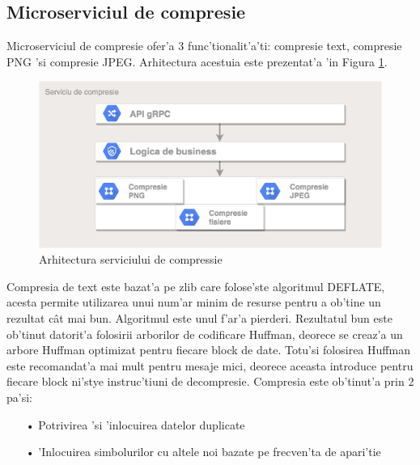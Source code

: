 \documentclass[12pt,a4paper,twoside]{report}
\begin{document}
\subsection{Microserviciul de compresie} \label{s_compession}
Microserviciul de compresie ofer'a 3 func'tionalit'a'ti: compresie text, compresie PNG 'si compresie JPEG. Arhitectura acestuia este prezentat'a 'in Figura \ref{compress_arch}.
\begin{figure}[H]
\begin{center}
\advance\leftskip-3cm
\advance\rightskip-3cm
\includegraphics[keepaspectratio=true,scale=0.55]{img/compression_arch.png}
\caption{Arhitectura serviciului de compressie}
\label{compress_arch}
\end{center}
\end{figure}


Compresia de text este bazat'a pe zlib care folose'ste algoritmul DEFLATE, acesta permite utilizarea unui num'ar minim de resurse pentru a ob'tine un rezultat cât mai bun. Algoritmul este unul f'ar'a pierderi.
Rezultatul bun este ob'tinut datorit'a folosirii arborilor de codificare Huffman, deorece se creaz'a un arbore Huffman optimizat pentru fiecare block de date. Totu'si folosirea Huffman este recomandat'a mai mult pentru mesaje mici, deorece aceasta introduce pentru fiecare block ni'stye instruc'tiuni de decompresie.
Compresia este ob'tinut'a prin 2 pa'si:
\begin{enumerate}
\item[•]Potrivirea 'si 'inlocuirea datelor duplicate
\item[•] 'Inlocuirea simbolurilor cu altele noi bazate pe frecven'ta de apari'tie
\end{enumerate}
\end{document}
